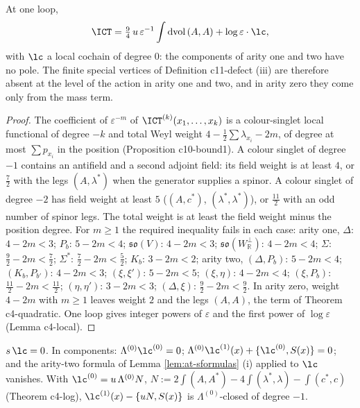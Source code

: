 \begin{proposition}
\label{prop:at-poles}
At one loop,
\[
\ICT=\tfrac94\,u\,\varepsilon^{-1}\int\mathrm{dvol}\,(A,A)+\log\varepsilon\cdot\lc,
\]
with $\lc$ a local cochain of degree $0$: the components of arity one and two have no pole. The finite special vertices of Definition c11-defect (iii) are therefore absent at the level of the action in arity one and two, and in arity zero they come only from the mass term.
\end{proposition}

\begin{proof}
The coefficient of $\varepsilon^{-m}$ of $\ICT^{(k)}(x_1,\dots,x_k)$ is a colour-singlet local functional of degree $-k$ and total Weyl weight $4-\tfrac12\sum\lambda_{x_i}-2m$, of degree at most $\sum p_{x_i}$ in the position (Proposition c10-bound1). A colour singlet of degree $-1$ contains an antifield and a second adjoint field: its field weight is at least $4$, or $\tfrac72$ with the legs $(A,\lambda^*)$ when the generator supplies a spinor. A colour singlet of degree $-2$ has field weight at least $5$ ($(A,c^*)$, $(\lambda^*,\lambda^*)$), or $\tfrac{11}2$ with an odd number of spinor legs. The total weight is at least the field weight minus the position degree. For $m\ge1$ the required inequality fails in each case: arity one, $\Delta$: $4-2m<3$; $P_b$: $5-2m<4$; $\mathfrak{so}(V)$: $4-2m<3$; $\mathfrak{so}(W^\perp_{\mathbb R})$: $4-2m<4$; $\Sigma$: $\tfrac92-2m<\tfrac72$; $\Sigma^*$: $\tfrac72-2m<\tfrac52$; $K_b$: $3-2m<2$; arity two, $(\Delta,P_b)$: $5-2m<4$; $(K_b,P_{b'})$: $4-2m<3$; $(\xi,\xi')$: $5-2m<5$; $(\xi,\eta)$: $4-2m<4$; $(\xi,P_b)$: $\tfrac{11}2-2m<\tfrac{11}2$; $(\eta,\eta')$: $3-2m<3$; $(\Delta,\xi)$: $\tfrac92-2m<\tfrac92$. In arity zero, weight $4-2m$ with $m\ge1$ leaves weight $2$ and the legs $(A,A)$, the term of Theorem c4-quadratic. One loop gives integer powers of $\varepsilon$ and the first power of $\log\varepsilon$ (Lemma c4-local).
\end{proof}

\begin{proposition}
\label{prop:at-log}
$s\,\lc=0$. In components: $\Lambda^{(0)}\lc^{(0)}=0$; $\Lambda^{(0)}\lc^{(1)}(x)+\{\lc^{(0)},S(x)\}=0$; and the arity-two formula of Lemma \ref{lem:at-sformulas} (i) applied to $\lc$ vanishes. With $\lc^{(0)}=u\,\Lambda^{(0)}N$, $N:=2\int(A,A^*)-4\int(\lambda^*,\lambda)-\int(c^*,c)$ (Theorem c4-log), $\lc^{(1)}(x)-\{uN,S(x)\}$ is $\Lambda^{(0)}$-closed of degree $-1$.
\end{proposition}

